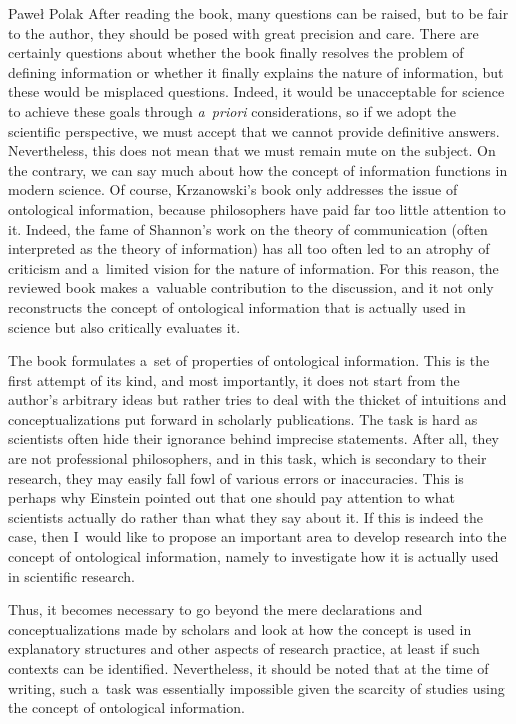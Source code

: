 \begin{newrevengenv}{Paweł Polak}
After reading the book, many questions can be raised, but to be fair to the author, they should be posed with great precision and care. There are certainly questions about whether the book finally resolves the problem of defining information or whether it finally explains the nature of information, but these would be misplaced questions. Indeed, it would be unacceptable for science to achieve these goals through \textit{a~priori} considerations, so if we adopt the scientific perspective, we must accept that we cannot provide definitive answers. Nevertheless, this does not mean that we must remain mute on the subject. On the contrary, we can say much about how the concept of information functions in modern science. Of course, Krzanowski's book only addresses the issue of ontological information, because philosophers have paid far too little attention to it. Indeed, the fame of Shannon's work on the theory of communication (often interpreted as the theory of information) has all too often led to an atrophy of criticism and a~limited vision for the nature of information. For this reason, the reviewed book makes a~valuable contribution to the discussion, and it not only reconstructs the concept of ontological information that is actually used in science but also critically evaluates it.

The book formulates a~set of properties of ontological information. This is the first attempt of its kind, and most importantly, it does not start from the author's arbitrary ideas but rather tries to deal with the thicket of intuitions and conceptualizations put forward in scholarly publications. The task is hard as scientists often hide their ignorance behind imprecise statements. After all, they are not professional philosophers, and in this task, which is secondary to their research, they may easily fall fowl of various errors or inaccuracies. This is perhaps why Einstein pointed out that one should pay attention to what scientists actually do rather than what they say about it. If this is indeed the case, then I~would like to propose an important area to develop research into the concept of ontological information, namely to investigate how it is actually used in scientific research.

Thus, it becomes necessary to go beyond the mere declarations and conceptualizations made by scholars and look at how the concept is used in explanatory structures and other aspects of research practice, at least if such contexts can be identified. Nevertheless, it should be noted that at the time of writing, such a~task was essentially impossible given the scarcity of studies using the concept of ontological information.


\end{newrevengenv}

